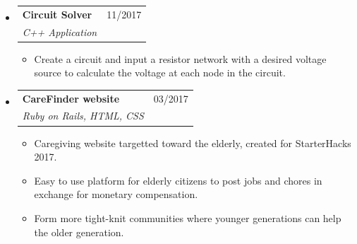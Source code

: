 \documentclass[letterpaper,11pt]{article}
\makeatletter
\newcommand{\resitem}[1]{\item #1 \vspace{-2pt}}
\newcommand{\ressubheading}[4]{
\begin{tabular*}{7.0in}{l@{\extracolsep{\fill}}r}
		\textbf{#1} & #2 \\
		\textit{#3} & \textit{#4} \\
\end{tabular*}\vspace{-6pt}}
\makeatother
\begin{document}
\begin{itemize}
  	\item
      \ressubheading{Circuit Solver}{11/2017}{C++ Application}{}
      \begin{itemize}
          \resitem{Create a circuit and input a resistor network with a desired voltage source to calculate the voltage at each node in the circuit.}
      \end{itemize}
    
    \item
      \ressubheading{CareFinder website}{03/2017}{Ruby on Rails, HTML, CSS}{}
      \begin{itemize}
          \resitem{Caregiving website targetted toward the elderly, created for StarterHacks 2017.}
          \resitem{Easy to use platform for elderly citizens to post jobs and chores in exchange for monetary compensation.}
          \resitem{Form more tight-knit communities where younger generations can help the older generation.}
      \end{itemize}
    
\end{itemize}

\pagebreak
\end{document}
